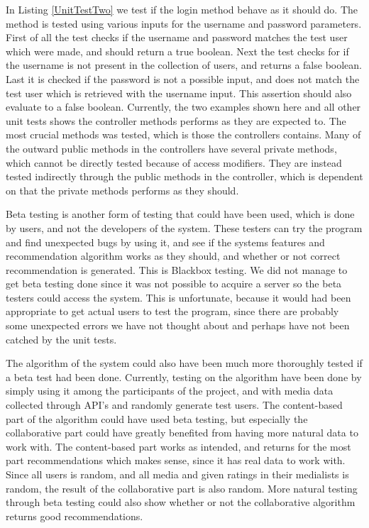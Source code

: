 In Listing \ref{UnitTestTwo} we test if the login method behave as it should do. The method is tested using various inputs for the username and password parameters. First of all the test checks if the username and password matches the test user which were made, and should return a true boolean. Next the test checks for if the username is not present in the collection of users, and returns a false boolean. Last it is checked if the password is not a possible input, and does not match the test user which is retrieved with the username input. This assertion should also evaluate to a false boolean. Currently, the two examples shown here and all other unit tests shows the controller methods performs as they are expected to. The most crucial methods was tested, which is those the controllers contains. Many of the outward public methods in the controllers have several private methods, which cannot be directly tested because of access modifiers. They are instead tested indirectly through the public methods in the controller, which is dependent on that the private methods performs as they should.

Beta testing is another form of testing that could have been used, which is done by users, and not the developers of the system. These testers can try the program and find unexpected bugs by using it, and see if the systems features and recommendation algorithm works as they should, and whether or not correct recommendation is generated. This is Blackbox testing. We did not manage to get beta testing done since it was not possible to acquire a server so the beta testers could access the system. This is unfortunate, because it would had been appropriate to get actual users to test the program, since there are probably some unexpected errors we have not thought about and perhaps have not been catched by the unit tests.

The algorithm of the system could also have been much more thoroughly tested if a beta test had been done. Currently, testing on the algorithm have been done by simply using it among the participants of the project, and with media data collected through API’s and randomly generate test users. The content-based part of the algorithm could have used beta testing, but especially the collaborative part could have greatly benefited from having more natural data to work with. The content-based part works as intended, and returns for the most part recommendations which makes sense, since it has real data to work with. Since all users is random, and all media and given ratings in their medialists is random, the result of the collaborative part is also random. More natural testing through beta testing could also show whether or not the collaborative algorithm returns good recommendations.